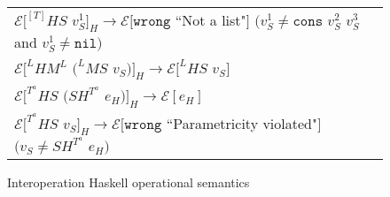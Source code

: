 \begin{figure}[p]
\begin{tabular}{l}
\vspace{5pt}

$\mathscr{E}[^{[T]}HS$ $v_{S}^{1}]_{H}\rightarrow\mathscr{E}[\mathtt{wrong}$ ``Not a list"$]$ $(v_{S}^{1}\neq\mathtt{cons}$ $v_{S}^{2}$ $v_{S}^{3}$ and $v_{S}^{1}\neq\mathtt{nil})$ \\

\vspace{5pt}

$\mathscr{E}[^{L}HM^{L}$ $(^{L}MS$ $v_{S})]_{H}\rightarrow\mathscr{E}[^{L}HS$ $v_{S}]$ \\

\vspace{5pt}

$\mathscr{E}[^{T^{a}}HS$ $(SH^{T^{a}}$ $e_{H})]_{H}\rightarrow\mathscr{E}[e_{H}]$ \\

\vspace{5pt}

$\mathscr{E}[^{T^{a}}HS$ $v_{S}]_{H}\rightarrow\mathscr{E}[\mathtt{wrong}$ ``Parametricity violated"$]$ $(v_{S}\neq SH^{T^{a}}$ $e_{H})$ \\
\end{tabular}
\caption{Interoperation Haskell operational semantics}
\label{ihos}
\end{figure}